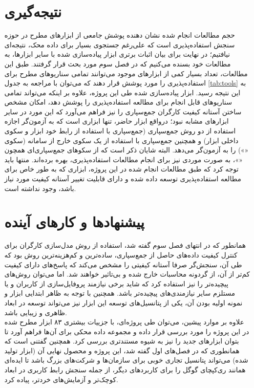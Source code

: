 \section{نتیجه‌گیری}
حجم مطالعات انجام شده نشان دهنده پوشش جامعی از ابزارهای مطرح در حوزه سنجش استفاده‌پذیری است که علی‌رغم جستجوی بسیار برای داده‌ محک، نتیجه‌ای نیافتیم؛ در نهایت برای بیان اثبات برتری ابزار پیاده‌سازی شده با سایر ابزارها، به مطالعات خود بسنده می‌کنیم که در فصل سوم مورد بحث قرار گرفتند. طبق این مطالعات، تعداد بسیار کمی از ابزارهای موجود می‌توانند تمامی سناریو‌های مطرح برای استفاده‌پذیری را مورد پوشش قرار دهند که می‌توان با مراجعه به جدول
\ref{tab:tools}
به این نتیجه رسید. ابزار پیاده‌سازی شده طی این پروژه، علاوه بر اینکه می‌تواند تمامی سناریوهای قابل انجام برای مطالعه استفاده‌پذیری را پوشش دهد، امکان مشخص ساختن آستانه کیفیت
کارگران جمع‌سپاری را نیز فراهم می‌آورد که این مورد در سایر ابزارهای مشابه نبود؛ درواقع ابزار حاضر، تنها ابزاری است که به آزمون‌گر اجازه استفاده از دو روش جمع‌سپاری (جمع‌سپاری با استفاده از رابط خود ابزار و سکوی داخلی ابزار) و همچنین جمع‌سپاری با استفاده از یک سکوی خارج از سامانه (سکوی
«»)
را به آزمون‌گر می‌دهد. البته شایان ذکر است که از سکوهای جمع‌سپاری‌ای همچون
«»،
به صورت موردی
نیز برای انجام مطالعات استفاده‌پذیری، بهره برده‌اند. منتها باید توجه کرد که طبق مطالعات انجام شده در این پروژه، ابزاری که به طور خاص برای مطالعه استفاده‌پذیری توسعه داده شده و دارای قابلیت تغییر آستانه کیفیت مورد نیاز باشد، وجود نداشته است.
\section{پیشنهادها و کارهای آینده}
همانطور که در انتهای فصل سوم گفته شد، استفاده از روش مدل‌سازی کارگران برای کنترل کیفیت داده‌های حاصل از جمع‌سپاری، ساده‌ترین و کم‌هزینه‌ترین روش بود که طی آن، سنجش‌گر صرفا آستانه کیفیتی را مشخص می‌کند که پاسخ‌های دارای کیفیت کم‌تر از آن، از گردونه محاسبات خارج شده و بی‌تاثیر خواهند شد. اما می‌توان روش‌های پیچیده‌تر را نیز استفاده کرد که شاید برخی نیازمند پروفایل‌سازی از کاربران و یا مستلزم سایر نیازمندی‌های پیچیده‌تر باشد. همچنین با توجه به ظاهر ابتدایی ابزار و نمونه اولیه بودن آن، یکی از پتانسیل‌های توسعه این ابزار نیز می‌تواند توسعه در ابعاد ظاهری و زیبایی باشد.\\
علاوه بر موارد پیشین، می‌توان طی پروژه‌ای، با جزییات بیشتری ۸۳ ابزار مطرح شده در این پروژه را مورد بررسی قرار داده و مجموعه داده محکی برای آن‌ها فراهم آورد تا بتوان ابزارهای جدید را نیز به شیوه مستندتری بررسی کرد. همچنین گفتنی است که همانطوری که در فصل‌های اول گفته شد، این پروژه و محصول نهایی آن (ابزار تولید شده) می‌تواند پتانسیل تجاری خوبی برای سازمان‌ها و شرکت‌های بزرگ باشد تا ایده‌ای همانند ری‌کپچای گوگل را برای کاربردهای دیگر، از جمله سنجش رابط کاربری در ابعاد کوچک‌تر و آزمایش‌های خردتر، پیاده کرد.